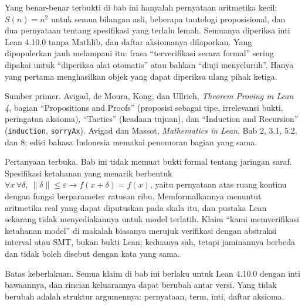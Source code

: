 \begin{untukpeneliti}
Yang benar-benar terbukti di bab ini hanyalah pernyataan aritmetika kecil: $S(n)=n^{2}$ untuk
semua bilangan asli, beberapa tautologi proposisional, dan dua pernyataan tentang spesifikasi yang
terlalu lemah. Semuanya diperiksa inti Lean 4.10.0 tanpa Mathlib, dan daftar aksiomanya
dilaporkan. Yang dipopulerkan jauh melampaui itu: frasa ``terverifikasi secara formal'' sering
dipakai untuk ``diperiksa alat otomatis'' atau bahkan ``diuji menyeluruh''. Hanya yang pertama
menghasilkan objek yang dapat diperiksa ulang pihak ketiga.

Sumber primer. Avigad, de Moura, Kong, dan Ullrich, \emph{Theorem Proving in Lean 4}, bagian
``Propositions and Proofs'' (proposisi sebagai tipe, irrelevansi bukti, peringatan aksioma),
``Tactics'' (keadaan tujuan), dan ``Induction and Recursion'' (\texttt{induction},
\texttt{sorryAx}). Avigad dan Massot, \emph{Mathematics in Lean}, Bab 2, 3.1, 5.2, dan 8; edisi
bahasa Indonesia memakai penomoran bagian yang sama.

Pertanyaan terbuka. Bab ini tidak memuat bukti formal tentang jaringan saraf. Spesifikasi ketahanan yang menarik
berbentuk
$\forall x\,\forall\delta,\ \lVert\delta\rVert\le\varepsilon\to f(x+\delta)=f(x)$, yaitu
pernyataan atas ruang kontinu dengan fungsi berparameter ratusan ribu. Memformalkannya menuntut
aritmetika real yang dapat diputuskan pada skala itu, dan pustaka Lean sekarang tidak menyediakannya
untuk model terlatih. Klaim ``kami memverifikasi ketahanan model'' di makalah
biasanya merujuk verifikasi dengan abstraksi interval atau SMT, bukan bukti Lean; keduanya sah,
tetapi jaminannya berbeda dan tidak boleh disebut dengan kata yang sama.

Batas keberlakuan. Semua klaim di bab ini berlaku untuk Lean 4.10.0 dengan inti bawaannya, dan
rincian keluarannya dapat berubah antar versi. Yang tidak berubah adalah struktur argumennya:
pernyataan, term, inti, daftar aksioma.
\end{untukpeneliti}

